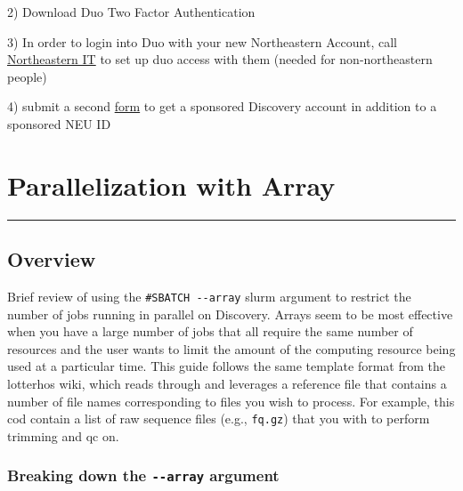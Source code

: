 \documentclass[
  letterpaper,
  DIV=11,
  numbers=noendperiod]{scrreprt}
\begin{document}
2) Download Duo Two Factor Authentication

3) In order to login into Duo with your new Northeastern Account, call
\href{https://its.northeastern.edu/support/}{Northeastern IT} to set up
duo access with them (needed for non-northeastern people)

4) submit a second
\href{https://rc-docs.northeastern.edu/en/latest/get_started/get_access.html}{form}
to get a sponsored Discovery account in addition to a sponsored NEU ID

\hypertarget{parallelization-with-array}{%
\chapter{Parallelization with Array}\label{parallelization-with-array}}

\begin{center}\rule{0.5\linewidth}{0.5pt}\end{center}

\hypertarget{overview-3}{%
\section*{\texorpdfstring{\textbf{Overview}}{Overview}}\label{overview-3}}

Brief review of using the \texttt{\#SBATCH\ -\/-array} slurm argument to
restrict the number of jobs running in parallel on Discovery. Arrays
seem to be most effective when you have a large number of jobs that all
require the same number of resources and the user wants to limit the
amount of the computing resource being used at a particular time. This
guide follows the same template format from the lotterhos wiki, which
reads through and leverages a reference file that contains a number of
file names corresponding to files you wish to process. For example, this
cod contain a list of raw sequence files (e.g., \texttt{fq.gz}) that you
with to perform trimming and qc on.

\hypertarget{breaking-down-the---array-argument}{%
\subsection*{\texorpdfstring{\textbf{Breaking down the
\texttt{-\/-array}
argument}}{Breaking down the -\/-array argument}}\label{breaking-down-the---array-argument}}
\end{document}
